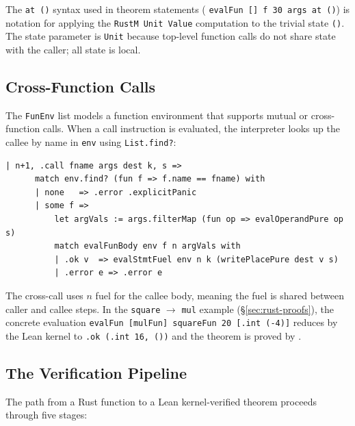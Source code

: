 The \texttt{at ()} syntax used in theorem statements (\eg
\texttt{evalFun [] f 30 args at ()}) is notation for applying the
\texttt{RustM Unit Value} computation to the trivial state \texttt{()}.
The state parameter is \texttt{Unit} because top-level function calls do not
share state with the caller; all state is local.

\subsection{Cross-Function Calls}
\label{sec:cross-calls}

The \texttt{FunEnv} list models a function environment that supports mutual
or cross-function calls. When a call instruction is evaluated, the interpreter
looks up the callee by name in \texttt{env} using \texttt{List.find?}:

\begin{lstlisting}[caption={Function call evaluation.},label={lst:funcall}]
  | n+1, .call fname args dest k, s =>
      match env.find? (fun f => f.name == fname) with
      | none   => .error .explicitPanic
      | some f =>
          let argVals := args.filterMap (fun op => evalOperandPure op s)
          match evalFunBody env f n argVals with
          | .ok v  => evalStmtFuel env n k (writePlacePure dest v s)
          | .error e => .error e
\end{lstlisting}

The cross-call uses $n$ fuel for the callee body, meaning the fuel is shared
between caller and callee steps. In the \texttt{square} $\to$ \texttt{mul}
example (\S\ref{sec:rust-proofs}), the concrete evaluation
\texttt{evalFun [mulFun] squareFun 20 [.int (-4)]} reduces by the
Lean kernel to \texttt{.ok (.int 16, ())} and the theorem is proved by \rfl.

\subsection{The Verification Pipeline}
\label{sec:pipeline}

The path from a Rust function to a Lean kernel-verified theorem proceeds
through five stages:

